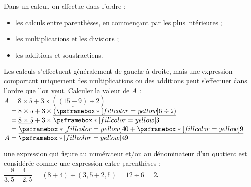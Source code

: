\begin{methode}
   Dans un calcul, on effectue dans l'ordre :
   \begin{itemize}
      \item les calculs entre parenthèses, en commençant par les plus intérieures ;
      \item les multiplications et les divisions ;
      \item les additions et soustractions.
   \end{itemize}
   Les calculs s'effectuent généralement de gauche à droite, mais une expression comportant uniquement des multiplications ou des additions peut s'effectuer dans l'ordre que l'on veut.
   \exercice
      Calculer la valeur de $A$ : \\
   \correction
      $A =8\times5+3\times(\underline{(15-9)}\div2)$ \\
      $\phantom{A} =8\times5+3\times\underline{(\psframebox*[fillcolor=yellow]{6}\div2)}$ \\
      $\phantom{A} =\underline{8\times5}+\underline{3\times\psframebox*[fillcolor=yellow]{3}}$ \\
      $\phantom{A} =\underline{\psframebox*[fillcolor=yellow]{40}+\psframebox*[fillcolor=yellow]{9}}$ \\
      $A = \psframebox*[fillcolor=yellow]{49}$
\end{methode}

\begin{remarque}
   une expression qui figure au numérateur et/ou au dénominateur d'un quotient est considérée comme une expression entre parenthèses : \\
   $\dfrac{8+4}{3,5+2,5} = (8+4)\div(3,5+2,5) =12\div6 =2$.
\end{remarque}



